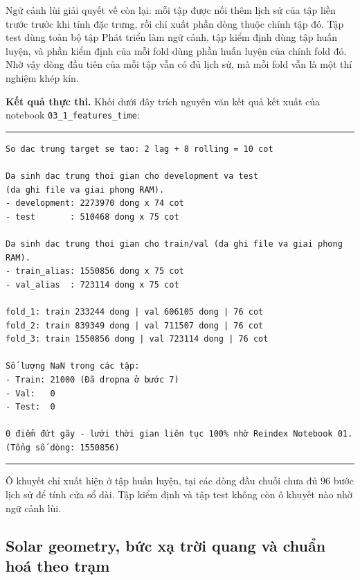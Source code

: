 \documentclass[12pt, a4paper]{report}
\begin{document}
Ngữ cảnh lùi giải quyết vế còn lại: mỗi tập được nối thêm lịch sử của tập liền trước
trước khi tính đặc trưng, rồi chỉ xuất phần dòng thuộc chính tập đó. Tập test dùng toàn
bộ tập Phát triển làm ngữ cảnh, tập kiểm định dùng tập huấn luyện, và phần kiểm định của
mỗi fold dùng phần huấn luyện của chính fold đó. Nhờ vậy dòng đầu tiên của mỗi tập vẫn có
đủ lịch sử, mà mỗi fold vẫn là một thí nghiệm khép kín.

\textbf{Kết quả thực thi.} Khối dưới đây trích nguyên văn kết quả kết xuất của notebook
\texttt{03\_1\_features\_time}:

\begingroup
\par\vspace{6pt}\hrule\vspace{4pt}
\footnotesize\renewcommand{\baselinestretch}{1.0}\selectfont
\begin{verbatim}
So dac trung target se tao: 2 lag + 8 rolling = 10 cot

Da sinh dac trung thoi gian cho development va test
(da ghi file va giai phong RAM).
- development: 2273970 dong x 74 cot
- test       : 510468 dong x 75 cot

Da sinh dac trung thoi gian cho train/val (da ghi file va giai phong RAM).
- train_alias: 1550856 dong x 75 cot
- val_alias  : 723114 dong x 75 cot

fold_1: train 233244 dong | val 606105 dong | 76 cot
fold_2: train 839349 dong | val 711507 dong | 76 cot
fold_3: train 1550856 dong | val 723114 dong | 76 cot

Số lượng NaN trong các tập:
- Train: 21000 (Đã dropna ở bước 7)
- Val:   0
- Test:  0

0 điểm đứt gãy - lưới thời gian liên tục 100% nhờ Reindex Notebook 01.
(Tổng số dòng: 1550856)
\end{verbatim}
\vspace{2pt}\hrule\par\vspace{6pt}
\endgroup

Ô khuyết chỉ xuất hiện ở tập huấn luyện, tại các dòng đầu chuỗi chưa đủ $96$ bước lịch sử
để tính cửa sổ dài. Tập kiểm định và tập test không còn ô khuyết nào nhờ ngữ cảnh lùi.

\FloatBarrier
\subsection{Solar geometry, bức xạ trời quang và chuẩn hoá theo trạm}
\end{document}
